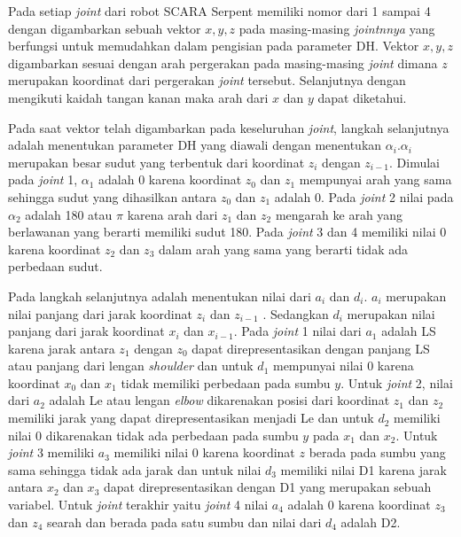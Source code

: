 Pada setiap \textit{joint} dari robot SCARA Serpent memiliki nomor dari 1 sampai 4 dengan digambarkan sebuah vektor $x, y, z$ pada masing-masing \textit{jointnnya} yang berfungsi untuk memudahkan dalam pengisian pada parameter DH. Vektor $x, y, z$ digambarkan sesuai dengan arah pergerakan pada masing-masing \textit{joint} dimana $z$ merupakan koordinat dari pergerakan \textit{joint} tersebut. Selanjutnya dengan mengikuti kaidah tangan kanan maka arah dari $x$ dan $y$ dapat diketahui. 

Pada saat vektor telah digambarkan pada keseluruhan \textit{joint}, langkah selanjutnya adalah menentukan parameter DH yang diawali dengan menentukan $\alpha_{i}. \alpha_{i}$ merupakan besar sudut yang terbentuk dari koordinat $z_{i}$ dengan $z_{i-1}$.  Dimulai pada \textit{joint} 1, $\alpha_{1}$ adalah 0 karena koordinat $z_{0}$ dan $z_{1}$ mempunyai arah yang sama sehingga sudut yang dihasilkan antara $z_{0}$ dan $z_{1}$ adalah 0.  Pada \textit{joint} 2 nilai pada $\alpha_{2}$ adalah 180 atau  $\pi$ karena arah dari  $z_{1}$ dan  $z_{2}$ mengarah ke arah yang berlawanan yang berarti memiliki sudut 180. Pada \textit{joint} 3 dan 4 memiliki nilai 0 karena koordinat $z_{2}$ dan $z_{3}$ dalam arah yang sama yang berarti tidak ada perbedaan sudut.

Pada langkah selanjutnya adalah menentukan nilai dari $a_{i}$ dan $d_{i}$. $a_{i}$ merupakan nilai panjang dari jarak koordinat  $z_{i}$  dan  $z_{i-1}$ . Sedangkan $d_{i}$ merupakan nilai panjang dari jarak koordinat $x_{i}$ dan $x_{i-1}$. Pada \textit{joint} 1 nilai dari $a_{1}$ adalah LS karena jarak antara $z_{1}$ dengan $z_{0}$ dapat direpresentasikan dengan panjang LS atau panjang dari lengan \textit{shoulder} dan untuk $d_{1}$ mempunyai nilai 0 karena koordinat $x_{0}$ dan $x_{1}$ tidak memiliki perbedaan pada sumbu $y$. Untuk \textit{joint} 2, nilai dari $a_{2}$ adalah Le atau lengan \textit{elbow} dikarenakan posisi dari koordinat $z_{1}$  dan $z_{2}$  memiliki jarak yang dapat direpresentasikan menjadi Le dan untuk  $d_{2}$ memiliki nilai 0 dikarenakan tidak ada perbedaan pada sumbu $y$ pada  $x_{1}$ dan  $x_{2}$.  Untuk \textit{joint} 3 memiliki $a_{3}$ memiliki nilai 0 karena koordinat $z$ berada pada sumbu yang sama sehingga tidak ada jarak dan untuk nilai $d_{3}$  memiliki nilai D1 karena jarak antara $x_{2}$ dan $x_{3}$ dapat direpresentasikan dengan D1 yang merupakan sebuah variabel. Untuk \textit{joint} terakhir yaitu \textit{joint} 4 nilai $a_{4}$ adalah 0 karena koordinat $z_{3}$ dan $z_{4}$ searah dan berada pada satu sumbu dan nilai dari $d_{4}$ adalah D2.

